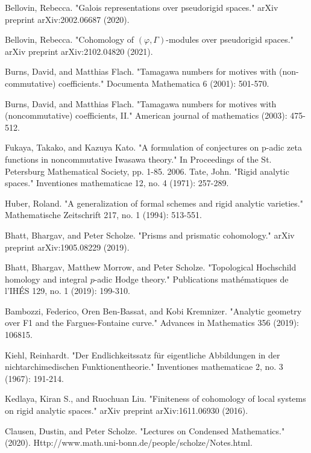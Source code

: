 \documentclass[11pt]{report}
\begin{document}
\begin{thebibliography}{1}
 Bellovin, Rebecca. "Galois representations over pseudorigid spaces." arXiv preprint arXiv:2002.06687 (2020).

 Bellovin, Rebecca. "Cohomology of $(\varphi,\Gamma) $-modules over pseudorigid spaces." arXiv preprint arXiv:2102.04820 (2021).


 Burns, David, and Matthias Flach. "Tamagawa numbers for motives with (non-commutative) coefficients." Documenta Mathematica 6 (2001): 501-570.


 Burns, David, and Matthias Flach. "Tamagawa numbers for motives with (noncommutative) coefficients, II." American journal of mathematics (2003): 475-512.


 Fukaya, Takako, and Kazuya Kato. "A formulation of conjectures on p-adic zeta functions in noncommutative Iwasawa theory." In Proceedings of the St. Petersburg Mathematical Society, pp. 1-85. 2006.
 Tate, John. "Rigid analytic spaces." Inventiones mathematicae 12, no. 4 (1971): 257-289.


 Huber, Roland. "A generalization of formal schemes and rigid analytic varieties." Mathematische Zeitschrift 217, no. 1 (1994): 513-551.





 Bhatt, Bhargav, and Peter Scholze. "Prisms and prismatic cohomology." arXiv preprint arXiv:1905.08229 (2019).

 Bhatt, Bhargav, Matthew Morrow, and Peter Scholze. "Topological Hochschild homology and integral $ p $-adic Hodge theory." Publications math\'ematiques de l'IH\'ES 129, no. 1 (2019): 199-310.


 Bambozzi, Federico, Oren Ben-Bassat, and Kobi Kremnizer. "Analytic geometry over F1 and the Fargues-Fontaine curve." Advances in Mathematics 356 (2019): 106815.


 Kiehl, Reinhardt. "Der Endlichkeitssatz f\"ur eigentliche Abbildungen in der nichtarchimedischen Funktionentheorie." Inventiones mathematicae 2, no. 3 (1967): 191-214.


 Kedlaya, Kiran S., and Ruochuan Liu. "Finiteness of cohomology of local systems on rigid analytic spaces." arXiv preprint arXiv:1611.06930 (2016).

 Clausen, Dustin, and Peter Scholze. "Lectures on Condensed Mathematics." (2020). Http://www.math.uni-bonn.de/people/scholze/Notes.html.


\end{thebibliography}
\end{document}
